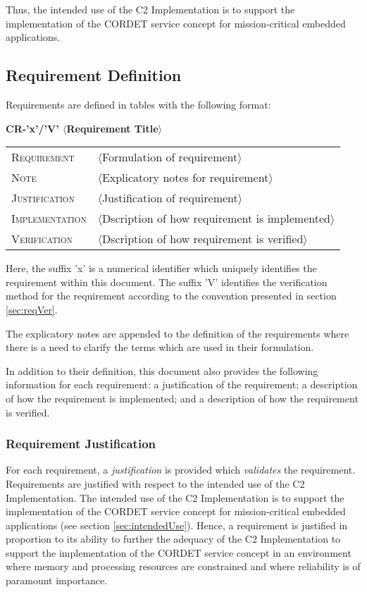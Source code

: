 \documentclass{pnp_article}
\begin{document}
Thus, the intended use of the C2 Implementation is to support the implementation of the CORDET service concept for mission-critical embedded applications.

\subsection{Requirement Definition}\label{sec:reqDef}
Requirements are defined in tables with the following format:

\hspace{0.2cm}\textbf{CR-'x'/'V' \hspace{0.9cm} $\langle$Requirement Title$\rangle$}
\vspace{-10pt}

\begin{longtable}{p{2.7cm}P{8.5cm}}
\hline
\textsc{Requirement} & $\langle$Formulation of requirement$\rangle$ \\
\textsc{Note} & $\langle$Explicatory notes for requirement$\rangle$ \\
\textsc{Justification} & $\langle$Justification of requirement$\rangle$ \\
\textsc{Implementation} & $\langle$Dscription of how requirement is implemented$\rangle$ \\ 
\textsc{Verification} & $\langle$Dscription of how requirement is verified$\rangle$ \\
\hline
\end{longtable}

Here, the suffix 'x' is a numerical identifier which uniquely identifies the requirement
within this document. The suffix 'V' identifies the verification method for the requirement according to the convention presented in section \ref{sec:reqVer}.

The explicatory notes are appended to the definition of the requirements where there is a need to clarify the terms which are used in their formulation.

In addition to their definition, this document also provides the following information for each requirement: a justification of the requirement; a description of how the requirement is implemented; and a description of how the requirement is verified. 

\subsubsection{Requirement Justification}
For each requirement, a \emph{justification} is provided which \emph{validates} the requirement. Requirements are justified with respect to the intended use of the C2 Implementation. The intended use of the C2 Implementation is to support the implementation of the CORDET service concept for mission-critical embedded applications (see section \ref{sec:intendedUse}).  Hence, a requirement is justified in proportion to its ability to further the adequacy of the C2 Implementation to support the implementation of the CORDET service concept in an environment where memory and processing resources are constrained and where reliability is of paramount importance. 
\end{document}
